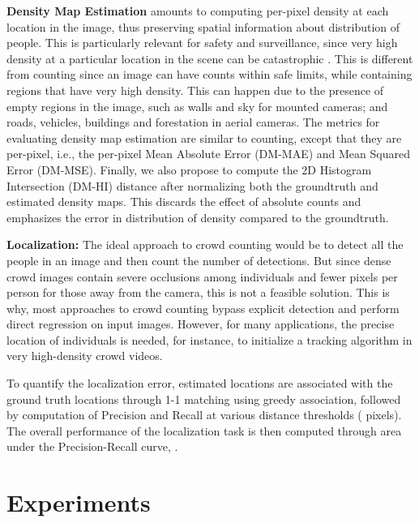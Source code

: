 \documentclass[runningheads]{llncs}
\begin{document}
\smallskip
\noindent\textbf{Density Map Estimation} amounts to computing per-pixel density at each location in the image, thus preserving spatial information about distribution of people. This is particularly relevant for safety and surveillance, since very high density at a particular location in the scene can be catastrophic \cite{guardian_hajj_2006}. This is different from counting since an image can have counts within safe limits, while containing regions that have very high density. This can happen due to the presence of empty regions in the image, such as walls and sky for mounted cameras; and roads, vehicles, buildings and forestation in aerial cameras. The metrics for evaluating density map estimation are similar to counting, except that they are per-pixel, i.e., the per-pixel Mean Absolute Error (DM-MAE) and Mean Squared Error (DM-MSE). Finally, we also propose to compute the 2D Histogram Intersection (DM-HI) distance after normalizing both the groundtruth and estimated density maps. This discards the effect of absolute counts and emphasizes the error in distribution of density compared to the groundtruth. 

\begin{comment}
This is given by,

\end{comment}

\smallskip
\noindent\textbf{Localization:} The ideal approach to crowd counting would be to detect all the people in an image and then count the number of detections. But since dense crowd images contain severe occlusions among individuals and fewer pixels per person for those away from the camera, this is not a feasible solution. This is why, most approaches to crowd counting bypass explicit detection and perform direct regression on input images. However, for many applications, the precise location of individuals is needed, for instance, to initialize a tracking algorithm in very high-density crowd videos.




To quantify the localization error, estimated locations are associated with the ground truth locations through 1-1 matching using greedy association, followed by computation of Precision and Recall at various distance thresholds ( pixels). The overall performance of the localization task is then computed through area under the Precision-Recall curve, .  

\section{Experiments}\label{secExperiments}
\end{document}
